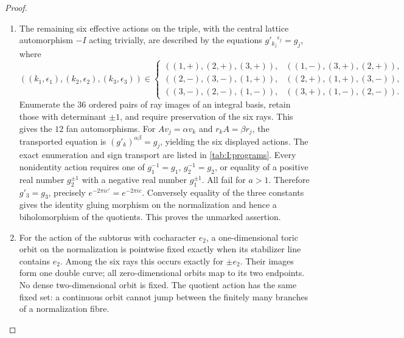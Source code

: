 \begin{proof}
\begin{enumerate}[label=\arabic*.,leftmargin=*]
\item The remaining six effective actions on the triple, with the central
lattice automorphism \(-I\) acting trivially, are described by the equations
\(g'_{k_j}{}^{\epsilon_j}=g_j\), where
\[
 ((k_1,\epsilon_1),(k_2,\epsilon_2),(k_3,\epsilon_3))
 \in\left\{
\begin{array}{lll}
((1,+),(2,+),(3,+)),&((1,-),(3,+),(2,+)),\\
((2,-),(3,-),(1,+)),&((2,+),(1,+),(3,-)),\\
((3,-),(2,-),(1,-)),&((3,+),(1,-),(2,-)).
\end{array}\right.
\]
Enumerate the $36$ ordered pairs of ray images of an integral basis,
retain those with determinant $\pm1$, and require preservation of the six
rays. This gives the $12$ fan automorphisms. For
$Av_j=\alpha v_k$ and $r_kA=\beta r_j$, the transported equation is
$(g'_k)^{\alpha\beta}=g_j$, yielding the six displayed actions.
The exact enumeration and sign transport are listed in
\cref{tab:I:programs}.
Every nonidentity action requires one of
\(g_1^{-1}=g_1\), \(g_2^{-1}=g_2\), or equality of a positive real number
\(g_2^{\pm1}\) with a negative real number \(g_1^{\pm1}\).
All fail for \(a>1\). Therefore \(g'_3=g_3\), precisely
\(e^{-2\pi ic'}=e^{-2\pi ic}\). Conversely equality of the three constants
gives the identity gluing morphism on the normalization and hence a
biholomorphism of the quotients. This proves the unmarked assertion.

\item For the action of the subtorus with cocharacter \(e_2\), a one-dimensional
toric orbit on the normalization is pointwise fixed exactly when its
stabilizer line contains \(e_2\). Among the six rays this occurs exactly
for \(\pm e_2\). Their images form one double curve; all zero-dimensional
orbits map to its two endpoints. No dense two-dimensional orbit is fixed.
The quotient action has the same fixed set: a continuous orbit cannot
jump between the finitely many branches of a normalization fibre.
\end{enumerate}
\end{proof}


